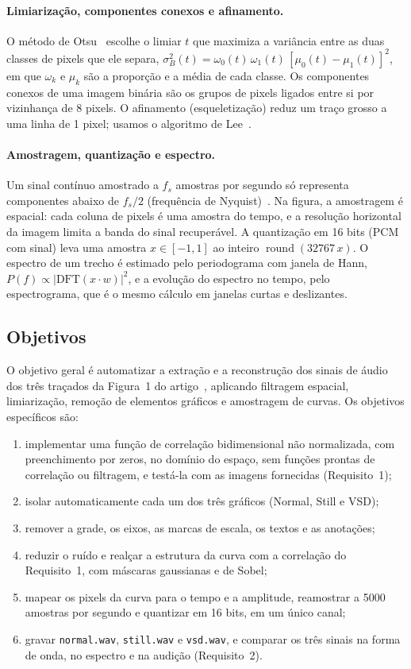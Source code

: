 \paragraph{Limiarização, componentes conexos e afinamento.}
O método de Otsu~\cite{otsu1979} escolhe o limiar $t$ que maximiza a variância entre as duas classes de pixels que ele separa, $\sigma_B^2(t)=\omega_0(t)\,\omega_1(t)\,[\mu_0(t)-\mu_1(t)]^2$, em que $\omega_k$ e $\mu_k$ são a proporção e a média de cada classe. Os componentes conexos de uma imagem binária são os grupos de pixels ligados entre si por vizinhança de 8 pixels. O afinamento (esqueletização) reduz um traço grosso a uma linha de 1 pixel; usamos o algoritmo de Lee~\cite{lee1994}.

\paragraph{Amostragem, quantização e espectro.}
Um sinal contínuo amostrado a $f_s$ amostras por segundo só representa componentes abaixo de $f_s/2$ (frequência de Nyquist)~\cite{oppenheim2010}. Na figura, a amostragem é espacial: cada coluna de pixels é uma amostra do tempo, e a resolução horizontal da imagem limita a banda do sinal recuperável. A quantização em 16 bits (PCM com sinal) leva uma amostra $x\in[-1,1]$ ao inteiro $\operatorname{round}(32767\,x)$. O espectro de um trecho é estimado pelo periodograma com janela de Hann, $P(f)\propto|\mathrm{DFT}(x\cdot w)|^2$, e a evolução do espectro no tempo, pelo espectrograma, que é o mesmo cálculo em janelas curtas e deslizantes.

\subsection{Objetivos}

O objetivo geral é automatizar a extração e a reconstrução dos sinais de áudio dos três traçados da Figura~1 do artigo~\cite{tomas2011}, aplicando filtragem espacial, limiarização, remoção de elementos gráficos e amostragem de curvas. Os objetivos específicos são:
\begin{enumerate}
\item implementar uma função de correlação bidimensional não normalizada, com preenchimento por zeros, no domínio do espaço, sem funções prontas de correlação ou filtragem, e testá-la com as imagens fornecidas (Requisito~1);
\item isolar automaticamente cada um dos três gráficos (Normal, Still e VSD);
\item remover a grade, os eixos, as marcas de escala, os textos e as anotações;
\item reduzir o ruído e realçar a estrutura da curva com a correlação do Requisito~1, com máscaras gaussianas e de Sobel;
\item mapear os pixels da curva para o tempo e a amplitude, reamostrar a 5000 amostras por segundo e quantizar em 16 bits, em um único canal;
\item gravar \texttt{normal.wav}, \texttt{still.wav} e \texttt{vsd.wav}, e comparar os três sinais na forma de onda, no espectro e na audição (Requisito~2).
\end{enumerate}

